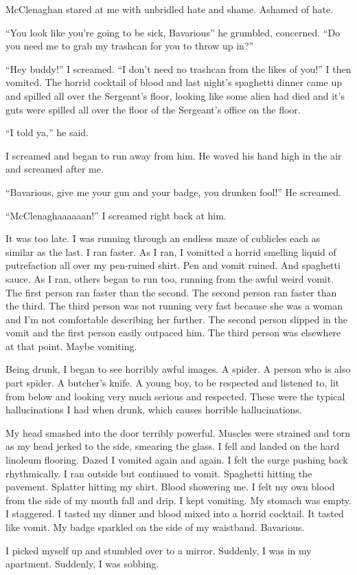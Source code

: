 McClenaghan stared at me with unbridled hate and shame. Ashamed of
hate.

``You look like you're going to be sick, Bavarious'' he grumbled,
concerned. ``Do you need me to grab my trashcan for you to throw up
in?''

``Hey buddy!'' I screamed. ``I don't need no trashcan from the likes
of you!'' I then vomited. The horrid cocktail of blood and last
night's spaghetti dinner came up and spilled all over the
Sergeant's floor, looking like some alien had died and it's guts
were spilled all over the floor of the Sergeant's office on the
floor.

``I told ya,'' he said.

I screamed and began to run away from him. He waved his hand high
in the air and screamed after me.

``Bavarious, give me your gun and your badge, you drunken fool!'' He
screamed.

``McClenaghaaaaaan!'' I screamed right back at him.

It was too late. I was running through an endless maze of cublicles
each as similar as the last. I ran faster. As I ran, I vomitted a
horrid smelling liquid of putrefaction all over my pen-ruined
shirt. Pen and vomit ruined. And spaghetti sauce. As I ran, others
began to run too, running from the awful weird vomit. The first
person ran faster than the second. The second person ran faster
than the third. The third person was not running very fast because
she was a woman and I'm not comfortable describing her further. The
second person slipped in the vomit and the first person easily
outpaced him. The third person was elsewhere at that point. Maybe
vomiting.

Being drunk, I began to see horribly awful images. A spider. A
person who is also part spider. A butcher's knife. A young boy, to
be respected and listened to, lit from below and looking very much
serious and respected. These were the typical hallucinations I had
when drunk, which causes horrible hallucinations.

My head smashed into the door terribly powerful. Muscles were
strained and torn as my head jerked to the side, smearing the
glass. I fell and landed on the hard linoleum flooring. Dazed I
vomited again and again. I felt the surge pushing back
rhythmically. I ran outside but continued to vomit. Spaghetti
hitting the pavement. Splatter hitting my shirt. Blood showering
me. I felt my own blood from the side of my mouth fall and drip. I
kept vomiting. My stomach was empty. I staggered. I tasted my
dinner and blood mixed into a horrid cocktail. It tasted like
vomit. My badge sparkled on the side of my waistband.
Bavarious.

I picked myself up and stumbled over to a mirror. Suddenly, I was
in my apartment. Suddenly, I was sobbing. 

 



